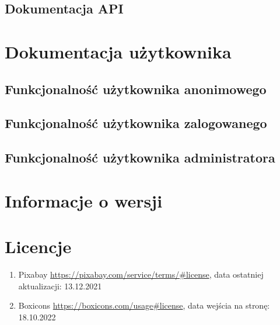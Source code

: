 \documentclass[12pt]{article}
\begin{document}
		\subsection{Dokumentacja API}	%
			
	\section{Dokumentacja użytkownika}
		\subsection{Funkcjonalność użytkownika anonimowego}
%		
		\subsection{Funkcjonalność użytkownika zalogowanego}
%		
		\subsection{Funkcjonalność użytkownika administratora}	
%	
	\section{Informacje o wersji}
	
	


	
	
			
	\pagebreak
	\section{Licencje}
		\begin{enumerate}
			\item	Pixabay
			\url{https://pixabay.com/service/terms/#license}, 
			data ostatniej aktualizacji: 13.12.2021
			
			
			\item	Boxicons
			\url{https://boxicons.com/usage#license}, 
			data wejścia na stronę: 18.10.2022
		\end{enumerate}
	
\end{document}
